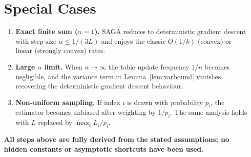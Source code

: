 \documentclass{article}
\begin{document}
\section*{Special Cases}
\begin{enumerate}[label=(\alph*)]
\item \textbf{Exact finite sum ($n=1$).} SAGA reduces to deterministic gradient descent with step size $\alpha\le 1/(3L)$ and enjoys the classic $O(1/k)$ (convex) or linear (strongly convex) rates.

\item \textbf{Large $n$ limit.} When $n\to\infty$ the table update frequency $1/n$ becomes negligible, and the variance term in Lemma~\ref{lem:varbound} vanishes, recovering the deterministic gradient descent behaviour.

\item \textbf{Non‑uniform sampling.} If index $i$ is drawn with probability $p_i$, the estimator becomes unbiased after weighting by $1/p_i$. The same analysis holds with $L$ replaced by $\max_i L_i/p_i$.

\end{enumerate}

\bigskip
\noindent\textbf{All steps above are fully derived from the stated assumptions; no hidden constants or asymptotic shortcuts have been used.}
\end{document}
